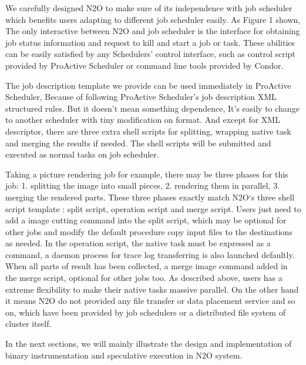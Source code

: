We carefully designed N2O to make sure of its independence with job scheduler which benefits users adapting to different job scheduler easily. As Figure 1 shown, The only interactive between N2O and job scheduler is the interface for obtaining job status information and request to kill and start a job or task. These abilities can be easily satisfied by any Schedulers’ control interface, such as control script provided by ProActive Scheduler or command line tools provided by Condor. 

The job description template we provide can be used immediately in ProActive Scheduler, Because of following ProActive Scheduler’s job description XML structured rules. But it doesn't mean something dependence, It’s easily to change to another scheduler with tiny modification on format. And except for XML descriptor, there are three extra shell scripts for splitting, wrapping native task and merging the results if needed. The shell scripts will be submitted and executed as normal tasks on job scheduler. 

Taking a picture rendering job for example, there may be three phases for this job: 1. splitting the image into small pieces, 2. rendering them in parallel, 3. merging the rendered parts. These three phases exactly match N2O‘s three shell script template : split script, operation script and merge script. Users just need to add a image cutting command into the split script, which may be optional for other jobs and modify the default procedure copy input files to the destinations as needed. In the operation script, the native task must be  expressed as a command, a daemon process for trace log transferring is also launched defaultly. When all parts of result has been collected, a merge image command added in the merge script, optional for other jobs too. As described above,  users has a extreme flexibility to make their native tasks massive parallel. On the other hand it means N2O do not provided any file transfer or data placement service and so on, which have been provided by job schedulers or a distributed file system of cluster itself.

In the next sections, we will mainly illustrate the design and implementation of binary instrumentation and speculative execution in N2O system.